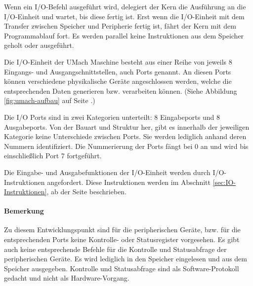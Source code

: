 Wenn ein I/O-Befehl ausgeführt wird, delegiert der Kern die Ausführung an die
I/O-Einheit und wartet, bis diese fertig ist. Erst wenn die I/O-Einheit
mit dem Transfer zwischen Speicher und Peripherie fertig ist, fährt der Kern mit
dem Programmablauf fort. Es werden parallel keine Instruktionen aus dem
Speicher geholt oder ausgeführt.


Die I/O-Einheit der UMach Maschine besteht aus einer Reihe von jeweils 8
Eingangs- und Ausgangschnittstellen, auch Ports
genannt. An diesen Ports können verschiedene physikalische Geräte angeschlossen
werden, welche die entsprechenden Daten generieren bzw. verarbeiten können.
(Siehe Abbildung \ref{fig:umach-aufbau} auf Seite \pageref{fig:umach-aufbau}.)


Die I/O Ports sind in zwei Kategorien unterteilt: 8 Eingabeports und 8
Ausgabeports. Von der Bauart und Struktur her, gibt es innerhalb der jeweiligen
Kategorie keine Unterschiede zwischen Ports. Sie werden lediglich anhand deren
Nummern identifiziert. Die Nummerierung der Ports fängt bei 0 an und wird bis
einschließlich Port 7 fortgeführt. 


Die Eingabe- und Ausgabefunktionen der I/O-Einheit werden durch
I/O-Instruktionen angefordert. Diese Instruktionen werden im Abschnitt
\ref{sec:IO-Instruktionen}, ab der Seite \pageref{sec:IO-Instruktionen}
beschrieben.


\paragraph{Bemerkung}
Zu diesem Entwicklungspunkt sind für die peripherischen Geräte, bzw. für die
entsprechenden Ports keine Kontrolle- oder Statusregister vorgesehen. Es gibt
auch keine entsprechende Befehle für die Kontrolle und Statusabfrage der
peripherischen Geräte. Es wird lediglich in den Speicher eingelesen und aus dem
Speicher ausgegeben. Kontrolle und Statusabfrage sind als Software-Protokoll
gedacht und nicht als Hardware-Vorgang.
